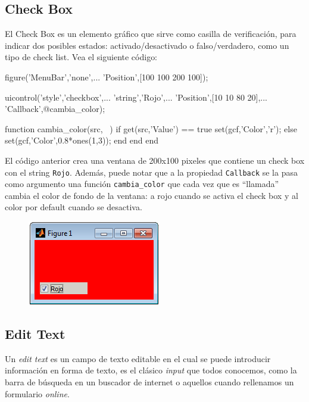 \subsection{Check Box}\label{check-box}

El Check Box es un elemento gráfico que sirve como casilla de
verificación, para indicar dos posibles estados: activado/desactivado o
falso/verdadero, como un tipo de check list. Vea el siguiente código:


\begin{matlab}
figure('MenuBar','none',...
    'Position',[100 100 200 100]);

uicontrol('style','checkbox',...
    'string','Rojo',...
    'Position',[10 10 80 20],...
    'Callback',@cambia_color);

    function cambia_color(src, ~)
        if get(src,'Value') == true
            set(gcf,'Color','r');
        else
            set(gcf,'Color',0.8*ones(1,3));
        end
    end
end
\end{matlab}

El código anterior crea una ventana de 200x100 pixeles que contiene un
check box con el string \texttt{Rojo}. Además, puede notar que a la
propiedad \texttt{Callback} se la pasa como argumento una función
\verb|cambia_color| que cada vez que es ``llamada'' cambia el color
de fondo de la ventana: a rojo cuando se activa el check box y al color
por default cuando se desactiva.

\begin{figure}[htbp]
\centering
\includegraphics[scale=0.8]{images/ch8/checkbox_example.png}
\caption{}
\end{figure}

\subsection{Edit Text}\label{edit-text}

Un \emph{edit text} es un campo de texto editable en el cual se puede
introducir información en forma de texto, es el clásico \emph{input} que
todos conocemos, como la barra de búsqueda en un buscador de internet o
aquellos cuando rellenamos un formulario \emph{online}.

